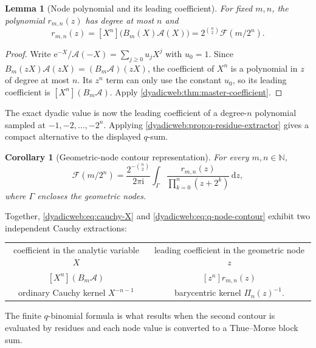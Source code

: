 \documentclass[11pt,oneside]{article}
\newtheorem{lemma}[lemma]{Lemma}
\newtheorem{corollary}[corollary]{Corollary}
\theoremstyle{definition}
\theoremstyle{remark}
\newcommand{\N}{\mathbb N}
\newcommand{\e}{\mathrm e}
\newcommand{\ii}{\mathrm i}
\newcommand{\dd}{\,\mathrm d}
\begin{document}
\begin{lemma}[Node polynomial and its leading coefficient]
\label{dyadicweb:lem:Rmn-leading}
For fixed $m,n$, the polynomial $r_{m,n}(z)$ has degree at most $n$ and
\begin{equation}
 [z^n]r_{m,n}(z)=[X^n]\bigl(B_m(X)\mathscr A(X)\bigr)
 =2^{\binom n2}\mathcal F(m/2^n).                         \label{dyadicweb:eq:Rmn-leading}
\end{equation}
\end{lemma}

\begin{proof}
Write
\(
 \e^{-X}/\mathscr A(-X)=\sum_{j\ge0}u_jX^j
\)
with $u_0=1$.  Since
$B_m(zX)\mathscr A(zX)=(B_m\mathscr A)(zX)$, the coefficient of $X^n$ is a polynomial in $z$
of degree at most $n$.  Its $z^n$ term can only use the constant $u_0$, so its leading
coefficient is $[X^n](B_m\mathscr A)$.  Apply \cref{dyadicweb:thm:master-coefficient}.
\end{proof}

The exact dyadic value is now the leading coefficient of a degree-$n$ polynomial sampled at
$-1,-2,\ldots,-2^n$.  Applying \cref{dyadicweb:prop:q-residue-extractor} gives a compact alternative
to the displayed $q$-sum.

\begin{corollary}[Geometric-node contour representation]
\label{dyadicweb:cor:q-node-contour}
For every $m,n\in\N$,
\begin{equation}
 \boxed{
 \mathcal F(m/2^n)=
 \frac{2^{-\binom n2}}{2\pi\ii}
 \int_\Gamma
 \frac{r_{m,n}(z)}{\prod_{k=0}^{n}(z+2^k)}\dd z,}          \label{dyadicweb:eq:q-node-contour}
\end{equation}
where $\Gamma$ encloses the geometric nodes.
\end{corollary}

Together, \eqref{dyadicweb:eq:cauchy-X} and \eqref{dyadicweb:eq:q-node-contour} exhibit two independent Cauchy
extractions:
\begin{center}
\begin{tabular}{c@{\qquad}c}
coefficient in the analytic variable $X$
& leading coefficient in the geometric node $z$ \\
$[X^n](B_m\mathscr A)$
& $[z^n]r_{m,n}(z)$ \\
ordinary Cauchy kernel $X^{-n-1}$
& barycentric kernel $\Pi_n(z)^{-1}$.
\end{tabular}
\end{center}
The finite $q$-binomial formula is what results when the second contour is evaluated by
residues and each node value is converted to a Thue--Morse block sum.
\end{document}
